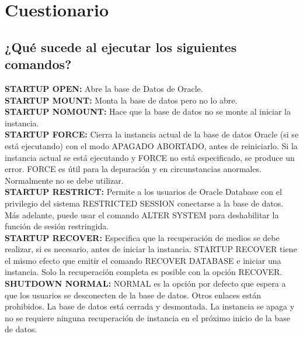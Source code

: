 \documentclass[12pt,letterpaper]{article}
\begin{document}
\section{Cuestionario}
\vspace{12pt}

\subsection{¿Qué sucede al ejecutar los siguientes comandos?}
\vspace{12pt}
\textbf{STARTUP OPEN:} Abre la base de Datos de Oracle.
\vspace{10pt}\\
\textbf{STARTUP MOUNT:} Monta la base de datos pero no lo abre.
\vspace{10pt}\\
\textbf{STARTUP NOMOUNT:} Hace que la base de datos no se monte al iniciar la instancia.
\vspace{10pt}\\
\textbf{STARTUP FORCE:} Cierra la instancia actual de la base de datos Oracle (si se está ejecutando) con el modo APAGADO ABORTADO, antes de reiniciarlo. Si la instancia actual se está ejecutando y FORCE no está especificado, se produce un error. FORCE es útil para la depuración y en circunstancias anormales. Normalmente no se debe utilizar.
\vspace{10pt}\\
\textbf{STARTUP RESTRICT:} Permite a los usuarios de Oracle Database con el privilegio del sistema RESTRICTED SESSION conectarse a la base de datos. Más adelante, puede usar el comando ALTER SYSTEM para deshabilitar la función de sesión restringida.
\vspace{10pt}\\
\textbf{STARTUP RECOVER:} Especifica que la recuperación de medios se debe realizar, si es necesario, antes de iniciar la instancia. STARTUP RECOVER tiene el mismo efecto que emitir el comando RECOVER DATABASE e iniciar una instancia. Solo la recuperación completa es posible con la opción RECOVER.
\vspace{10pt}\\
\textbf{SHUTDOWN NORMAL:} NORMAL es la opción por defecto que espera a que los usuarios se desconecten de la base de datos. Otros enlaces están prohibidos. La base de datos está cerrada y desmontada. La instancia se apaga y no se requiere ninguna recuperación de instancia en el próximo inicio de la base de datos.
\vspace{10pt}\\
\end{document}
